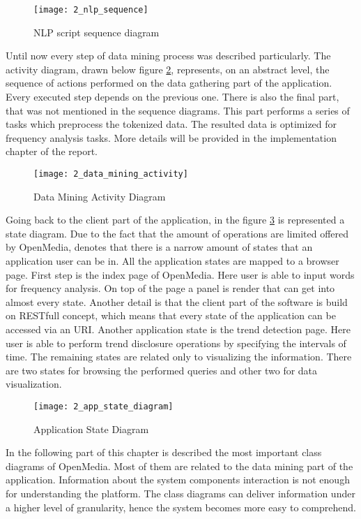 \begin{figure}[!ht]
\centering
\texttt{[image: 2\_nlp\_sequence]}
\caption{NLP script sequence diagram}\label{nlp_sequence}
\end{figure}

Until now every step of data mining process was described particularly. The activity diagram, drawn below figure \ref{data_mining_activity}, represents, on an abstract level, the sequence of actions performed on the data gathering part of the application. Every executed step depends on the previous one. There is also the final part, that was not mentioned in the sequence diagrams. This part performs a series of tasks which preprocess the tokenized data. The resulted data is optimized for frequency analysis tasks. More details will be provided in the implementation chapter of the report.

\begin{figure}[!ht]
\centering
\vspace*{0.2cm}
\texttt{[image: 2\_data\_mining\_activity]}
\caption{Data Mining Activity Diagram}\label{data_mining_activity}
\end{figure}

Going back to the client part of the application, in the figure \ref{app_state_diagram} is represented a state diagram. Due to the fact that the amount of operations are limited offered by OpenMedia, denotes that there is a narrow amount of states that an application user can be in. All the application states are mapped to a browser page. First step is the index page of OpenMedia. Here user is able to input words for frequency analysis. On top of the page a panel is render that can get into almost every state. Another detail is that the client part of the software is build on RESTfull concept, which means that every state of the application can be accessed via an URI. Another application state is the trend detection page. Here user is able to perform trend disclosure operations by specifying the intervals of time. The remaining states are related only to visualizing the information. There are two states for browsing the performed queries and other two for data visualization.

\begin{figure}[!ht]
\centering
\texttt{[image: 2\_app\_state\_diagram]}
\caption{Application State Diagram}\label{app_state_diagram}
\end{figure}

In the following part of this chapter is described the most important class diagrams of OpenMedia. Most of them are related to the data mining part of the application. Information about the system components interaction is not enough for understanding the platform. The class diagrams can deliver information under a higher level of granularity, hence the system becomes more easy to comprehend.

